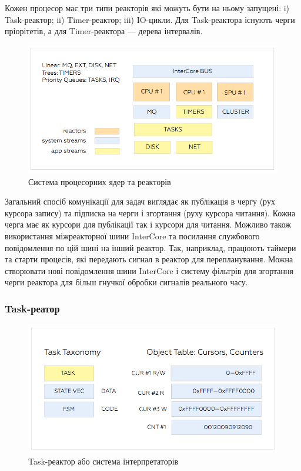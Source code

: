 \begin{definition}
\begin{definition}
\begin{definition}
\begin{definition}
Кожен процесор має три типи реакторів які можуть бути на ньому запущені:
i) Task-реактор; ii) Timer-реактор; iii) IO-цикли. Для Task-реактора
існують черги пріорітетів, а для Timer-реактора --- дерева інтервалів.

\begin{figure}[h]
  \centerline{\includegraphics[scale=0.28]{sys}}
  \caption{Система процесорних ядер та реакторів}
\end{figure}

Загальний спосіб комунікації для задач виглядає як публікація
в чергу (рух курсора запису) та підписка на черги і
згортання (руху курсора читання). Кожна черга має як
курсори для публікації так і курсори для читання. Можливо також
використання міжреакторної шини InterCore та посилання
службового повідомлення по цій шині на інший реактор. Так,
наприклад, працюють таймери та старти процесів, які передають
сигнал в реактор для перепланування. Можна створювати нові повідомлення
шини InterCore і систему фільтрів для згортання черги
реактора для більш гнучкої обробки сигналів реального часу.

\subsubsection*{Task-реатор}


\begin{figure}[h]
  \centerline{\includegraphics[scale=0.28]{task}}
  \caption{Task-реактор або система інтерпретаторів}
\end{figure}


\end{definition}
\end{definition}
\end{definition}
\end{definition}
